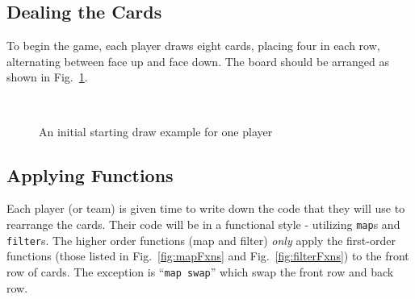 \documentclass[sigconf]{acmart}
\begin{document}
\subsection{Dealing the Cards}
\label{sec:stage1}

To begin the game, each player draws eight cards, placing four in each row, alternating between face up and face down. 
The board should be arranged as shown in Fig.~\ref{fig:initDraw}.

\begin{figure}[h!]
    \crdJs \crdback \crdtens \crdback\\
    \crdback \crdtwoh \crdback \crdfours
    \caption{An initial starting draw example for one player}
    \label{fig:initDraw}

\end{figure}


\subsection{Applying Functions}
\label{sec:stage2}

Each player (or team) is given time to write down the code that they will use to rearrange the cards. 
Their code will be in a functional style - utilizing \texttt{map}s and \texttt{filter}s.
The higher order functions (map and filter) \textit{only} apply the first-order functions (those listed in Fig.~\ref{fig:mapFxns} and Fig.~\ref{fig:filterFxns}) to the front row of cards. 
The exception is ``\texttt{map swap}'' which swap the front row and back row.
\end{document}
